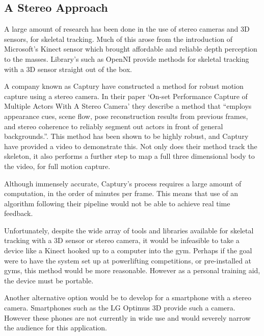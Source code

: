 \subsection{A Stereo Approach}

A large amount of research has been done in the use of stereo cameras and 3D sensors, for skeletal tracking. Much of this arose from the introduction of Microsoft's Kinect\cite{kinect} sensor which brought affordable and reliable depth perception to the masses. Library's such as OpenNI\cite{openni} provide methods for skeletal tracking with a 3D sensor straight out of the box.

A company known as Captury\cite{captury} have constructed a method for robust motion capture using a stereo camera. In their paper `On-set Performance Capture of Multiple Actors With A Stereo Camera'\cite{capturystereopaper} they describe a method that ``employs appearance cues, scene flow, pose reconstruction results from previous frames, and stereo coherence to reliably segment out actors in front of general backgrounds.''. This method has been shown to be highly robust, and Captury have provided a video\cite{capturyvideo} to demonstrate this. Not only does their method track the skeleton, it also performs a further step to map a full three dimensional body to the video, for full motion capture.

Although immensely accurate, Captury's process requires a large amount of computation, in the order of minutes per frame. This means that use of an algorithm following their pipeline would not be able to achieve real time feedback.

Unfortunately, despite the wide array of tools and libraries available for skeletal tracking with a 3D sensor or stereo camera, it would be infeasible to take a device like a Kinect hooked up to a computer into the gym. Perhaps if the goal were to have the system set up at powerlifting competitions, or pre-installed at gyms, this method would be more reasonable. However as a personal training aid, the device must be portable.

Another alternative option would be to develop for a smartphone with a stereo camera. Smartphones such as the LG Optimus 3D\cite{lgoptimus} provide such a camera. However these phones are not currently in wide use and would severely narrow the audience for this application.

